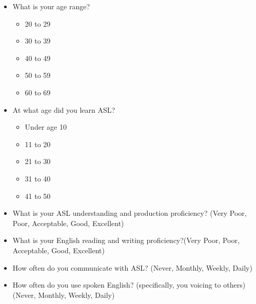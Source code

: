 \begin{itemize}
\begin{itemize}
\begin{itemize}
        \end{itemize}
        \item What is your age range?
        \begin{itemize}
            \item 20 to 29
            \item 30 to 39
            \item 40 to 49
            \item 50 to 59
            \item 60 to 69
        \end{itemize}
        \item At what age did you learn ASL?
        \begin{itemize}
            \item Under age 10
            \item 11 to 20
            \item 21 to 30
            \item 31 to 40
            \item 41 to 50
        \end{itemize}
        \item What is your ASL understanding and production proficiency? (Very Poor, Poor, Acceptable, Good, Excellent)
        \item What is your English reading and writing proficiency?(Very Poor, Poor, Acceptable, Good, Excellent)
        \item How often do you communicate with ASL? (Never, Monthly, Weekly, Daily)
        \item How often do you use spoken English? (specifically, you voicing to others) (Never, Monthly, Weekly, Daily)
    \end{itemize}
\end{itemize}